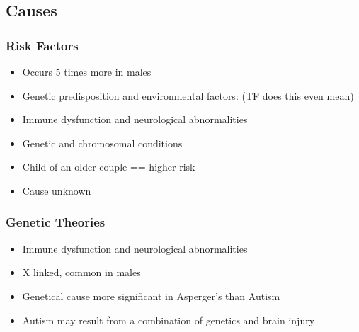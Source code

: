 \documentclass[journal, 12pt]{IEEEtran}
\begin{document}
\subsection{Causes}
\subsubsection{Risk Factors}
\begin{itemize}
\item Occurs 5 times more in males
\item Genetic predisposition and environmental factors: (TF does this even mean)
\item Immune dysfunction and neurological abnormalities
\item Genetic and chromosomal conditions 
\item Child of an older couple == higher risk 
\item Cause unknown
\end{itemize}
\subsubsection{Genetic Theories}
\begin{itemize}
\item Immune dysfunction and neurological abnormalities
\item X linked, common in males
\item Genetical cause more significant in Asperger's than Autism
\item Autism may result from a combination of genetics and brain injury 
\end{itemize}
\end{document}
